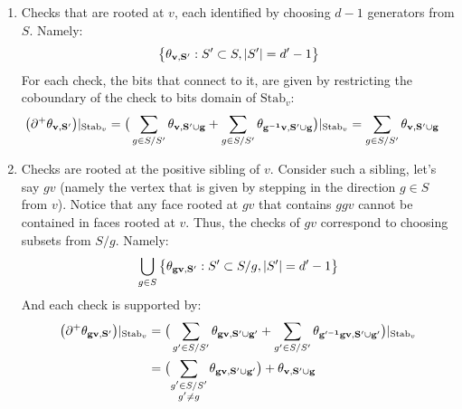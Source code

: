 \begin{enumerate}
  \item Checks that are rooted at $v$, each identified by choosing $d-1$ generators from $S$. Namely: 
    \begin{equation*}
      \begin{split}
        \big\{ \mathbf{\theta_{v ,S^{\prime}}{} }{}: S^{\prime} \subset S , |S^{\prime}|=d^{\prime}-1  \big\} 
      \end{split}
    \end{equation*}
    For each check, the bits that connect to it, are given by restricting the coboundary of the check to bits domain of $\text{Stab}_{v}$:  
    \begin{equation*}
      \begin{split}
        \big( \partial^{+} \mathbf{\theta_{v ,S^{\prime}}{} }{} \big)|_{\text{Stab}_{v}} & =  \big(   \sum_{g \in S/S^{\prime}} \mathbf{\theta_{v ,S^{\prime} \cup g} } + \sum_{g \in S/S^{\prime}} \mathbf{\theta_{g^{-1}v ,S^{\prime}\cup g} }  \big)|_{\text{Stab}_{v}} =     \sum_{g \in S/S^{\prime}} \mathbf{\theta_{v ,S^{\prime} \cup g} } 
      \end{split}
    \end{equation*}
  \item Checks are rooted at the positive sibling of $v$. Consider such a sibling, let's say $gv$ (namely the vertex that is given by stepping in the direction $g \in S$ from $v$). Notice that any face rooted at $gv$ that contains $ggv$ cannot be contained in faces rooted at $v$. Thus, the checks of $gv$ correspond to choosing subsets from $S/g$. Namely:
    \begin{equation*}
      \begin{split}
      \bigcup_{g \in S}\big\{ \mathbf{\theta_{gv ,S^{\prime}} }: S^{\prime} \subset S/g , |S^{\prime}|=d^{\prime}-1  \big\}
      \end{split}
    \end{equation*}
    And each check is supported by:
    \begin{equation*}
      \begin{split}
        \big( \partial^{+} \rotfv{gv}{S^{\prime}} \big)|_{\text{Stab}_{v}} & = 
        \big(   \sum_{g^{\prime} \in S/S^{\prime}} \rotfv{gv}{S^{\prime} \cup g^{\prime}} + \sum_{g^{\prime} \in S/S^{\prime}} \rotfv{g^{\prime -1}gv}{S^{\prime}\cup g^{\prime}} \big)|_{\text{Stab}_{v}} \\
        &  =    \bigl(\sum_{ \substack{ g^{\prime} \in S/S^{\prime} \\ g^{\prime } \neq g }} \rotfv{g v}{S^{\prime} \cup g^{\prime}} \bigr) + \rotfv{v}{S^{\prime}\cup g}

\end{split}
\end{equation*}
\end{enumerate}

